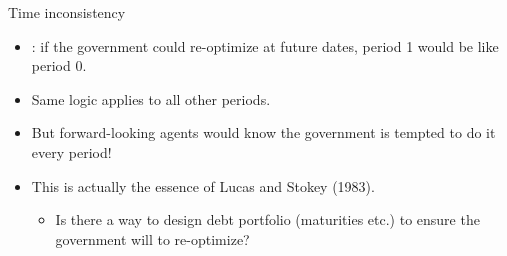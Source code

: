 \documentclass[11pt,xcolor={dvipsnames},hyperref={pdftex,pdfpagemode=UseNone,hidelinks,pdfdisplaydoctitle=true},usepdftitle=false]{beamer}
\begin{document}
    \begin{frame}{Time inconsistency}
        \begin{itemize}
        \item {}: if the government could re-optimize at future dates, period 1 would be like period 0. 
        \item Same logic applies to all other periods.
        \item But forward-looking agents would know the government is tempted to do it every period!
        \item This is actually the essence of Lucas and Stokey (1983).
            \begin{itemize}
                        \item Is there a way to design debt portfolio (maturities etc.) to ensure the government will  to re-optimize?
            \end{itemize}
    \end{itemize}
    \end{frame}   
\end{document}

